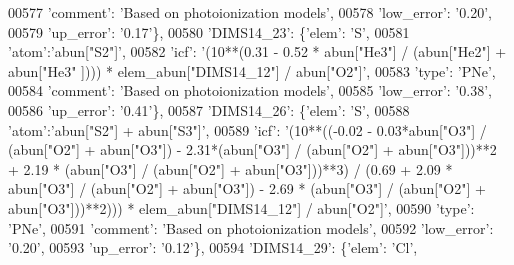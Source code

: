 \begin{DoxyCode}
00577                                        \textcolor{stringliteral}{'comment'}: \textcolor{stringliteral}{'Based on photoionization models'},
00578                                        \textcolor{stringliteral}{'low\_error'}: \textcolor{stringliteral}{'0.20'},
00579                                        \textcolor{stringliteral}{'up\_error'}: \textcolor{stringliteral}{'0.17'}\},
00580                          \textcolor{stringliteral}{'DIMS14\_23'}: \{\textcolor{stringliteral}{'elem'}: \textcolor{stringliteral}{'S'},
00581                                        \textcolor{stringliteral}{'atom'}:\textcolor{stringliteral}{'abun["S2"]'}, 
00582                                        \textcolor{stringliteral}{'icf'}: \textcolor{stringliteral}{'(10**(0.31 - 0.52 * abun["He3"] / (abun["He2"] + abun["He3"
      ]))) * elem\_abun["DIMS14\_12"] / abun["O2"]'},
00583                                        \textcolor{stringliteral}{'type'}: \textcolor{stringliteral}{'PNe'},
00584                                        \textcolor{stringliteral}{'comment'}: \textcolor{stringliteral}{'Based on photoionization models'},
00585                                        \textcolor{stringliteral}{'low\_error'}: \textcolor{stringliteral}{'0.38'},
00586                                        \textcolor{stringliteral}{'up\_error'}: \textcolor{stringliteral}{'0.41'}\},
00587                          \textcolor{stringliteral}{'DIMS14\_26'}: \{\textcolor{stringliteral}{'elem'}: \textcolor{stringliteral}{'S'},
00588                                        \textcolor{stringliteral}{'atom'}:\textcolor{stringliteral}{'abun["S2"] + abun["S3"]'}, 
00589                                        \textcolor{stringliteral}{'icf'}: \textcolor{stringliteral}{'(10**((-0.02 - 0.03*abun["O3"] / (abun["O2"] + abun["O3"]) -
       2.31*(abun["O3"] / (abun["O2"] + abun["O3"]))**2 + 2.19 * (abun["O3"] / (abun["O2"] + abun["O3"]))**3) /
       (0.69 + 2.09 * abun["O3"] / (abun["O2"] + abun["O3"]) - 2.69 * (abun["O3"] / (abun["O2"] + abun["O3"]))**2)))
       * elem\_abun["DIMS14\_12"] / abun["O2"]'},
00590                                        \textcolor{stringliteral}{'type'}: \textcolor{stringliteral}{'PNe'},
00591                                        \textcolor{stringliteral}{'comment'}: \textcolor{stringliteral}{'Based on photoionization models'},
00592                                        \textcolor{stringliteral}{'low\_error'}: \textcolor{stringliteral}{'0.20'},
00593                                        \textcolor{stringliteral}{'up\_error'}: \textcolor{stringliteral}{'0.12'}\},
00594                          \textcolor{stringliteral}{'DIMS14\_29'}: \{\textcolor{stringliteral}{'elem'}: \textcolor{stringliteral}{'Cl'},

\end{DoxyCode}
